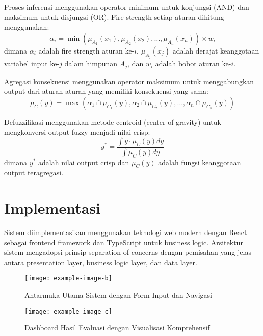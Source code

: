 \documentclass[12pt,a4paper]{article}
\begin{document}
Proses inferensi menggunakan operator minimum untuk konjungsi (AND) dan maksimum untuk disjungsi (OR). Fire strength setiap aturan dihitung menggunakan:
\begin{equation}
\alpha_i = \min(\mu_{A_1}(x_1), \mu_{A_2}(x_2), \dots, \mu_{A_n}(x_n)) \times w_i
\end{equation}
dimana $\alpha_i$ adalah fire strength aturan ke-$i$, $\mu_{A_j}(x_j)$ adalah derajat keanggotaan variabel input ke-$j$ dalam himpunan $A_j$, dan $w_i$ adalah bobot aturan ke-$i$.

Agregasi konsekuensi menggunakan operator maksimum untuk menggabungkan output dari aturan-aturan yang memiliki konsekuensi yang sama:
\begin{equation}
\mu_C(y) = \max(\alpha_1 \cap \mu_{C_1}(y), \alpha_2 \cap \mu_{C_2}(y), \dots, \alpha_n \cap \mu_{C_n}(y))
\end{equation}

Defuzzifikasi menggunakan metode centroid (center of gravity) untuk mengkonversi output fuzzy menjadi nilai crisp:
\begin{equation}
y^* = \frac{\int y \cdot \mu_C(y) dy}{\int \mu_C(y) dy}
\end{equation}
dimana $y^*$ adalah nilai output crisp dan $\mu_C(y)$ adalah fungsi keanggotaan output teragregasi.

\section{Implementasi}

Sistem diimplementasikan menggunakan teknologi web modern dengan React sebagai frontend framework dan TypeScript untuk business logic. Arsitektur sistem mengadopsi prinsip separation of concerns dengan pemisahan yang jelas antara presentation layer, business logic layer, dan data layer.

\begin{figure}[htbp] %
    \centering
    \texttt{[image: example-image-b]} %
    \caption{Antarmuka Utama Sistem dengan Form Input dan Navigasi}
    \label{fig:ui-main}
\end{figure}

\begin{figure}[htbp] %
    \centering
    \texttt{[image: example-image-c]} %
    \caption{Dashboard Hasil Evaluasi dengan Visualisasi Komprehensif}
    \label{fig:ui-results}
\end{figure}
\end{document}
